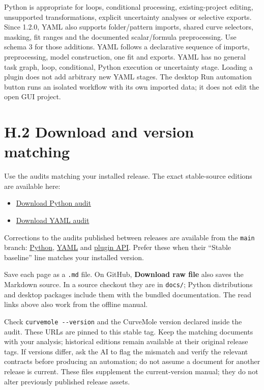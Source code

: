 \documentclass[
  10pt,
  a4paper,
  oneside]{scrreprt}
\providecommand{\tightlist}{%
  \setlength{\itemsep}{0pt}\setlength{\parskip}{0pt}}
\begin{document}
Python is appropriate for loops, conditional processing,
existing-project editing, unsupported transformations, explicit
uncertainty analyses or selective exports. Since 1.2.0, YAML also
supports folder/pattern imports, shared curve selectors, masking, fit
ranges and the documented scalar/formula preprocessing. Use schema 3 for
those additions. YAML follows a declarative sequence of imports,
preprocessing, model construction, one fit and exports. YAML has no
general task graph, loop, conditional, Python execution or uncertainty
stage. Loading a plugin does not add arbitrary new YAML stages. The
desktop Run automation button runs an isolated workflow with its own
imported data; it does not edit the open GUI project.

\hypertarget{h.2-download-and-version-matching}{%
\section{H.2 Download and version
matching}\label{h.2-download-and-version-matching}}

Use the audits matching your installed release. The exact stable-source
editions are available here:

\begin{itemize}
\tightlist
\item
  \href{https://raw.githubusercontent.com/SebRoLENS/curvemole/v1.4.2/docs/ai-python-audit.md}{Download
  Python audit}
\item
  \href{https://raw.githubusercontent.com/SebRoLENS/curvemole/v1.4.2/docs/ai-yaml-audit.md}{Download
  YAML audit}
\end{itemize}

Corrections to the audits published between releases are available from
the \texttt{main} branch:
\href{https://raw.githubusercontent.com/SebRoLENS/curvemole/main/docs/ai-python-audit.md}{Python},
\href{https://raw.githubusercontent.com/SebRoLENS/curvemole/main/docs/ai-yaml-audit.md}{YAML}
and
\href{https://raw.githubusercontent.com/SebRoLENS/curvemole/main/docs/ai-plugin-audit.md}{plugin
API}. Prefer these when their ``Stable baseline'' line matches your
installed version.

Save each page as a \texttt{.md} file. On GitHub, \textbf{Download raw
file} also saves the Markdown source. In a source checkout they are in
\texttt{docs/}; Python distributions and desktop packages include them
with the bundled documentation. The read links above also work from the
offline manual.

Check \texttt{curvemole\ -\/-version} and the CurveMole version declared
inside the audit. These URLs are pinned to this stable tag. Keep the
matching documents with your analysis; historical editions remain
available at their original release tags. If versions differ, ask the AI
to flag the mismatch and verify the relevant contracts before producing
an automation; do not assume a document for another release is current.
These files supplement the current-version manual; they do not alter
previously published release assets.
\end{document}
